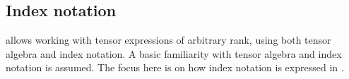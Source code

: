 \subsection{Index notation}
\label{ufl:sec:indexnotation}

\ufl{} allows working with tensor expressions of arbitrary rank,
using both tensor algebra and index notation.  A basic familiarity
with tensor algebra and index notation is assumed.  The focus here is
on how index notation is expressed in \ufl{}.

